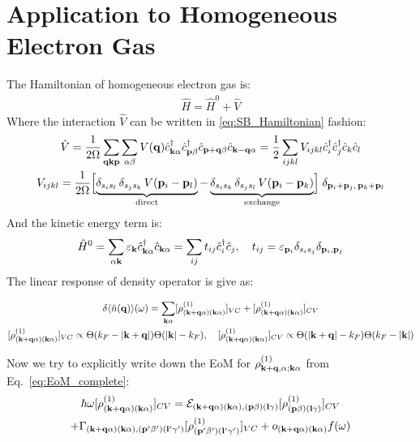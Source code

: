 \documentclass[11pt,letterpaper]{article}
\theoremstyle{definition}
\theoremstyle{plain}
\theoremstyle{remark}
\newcommand{\avg}[1]{\langle #1 \rangle}%
\newcommand{\eps}{\varepsilon}
\begin{document}
\section{Application to Homogeneous Electron Gas}
The Hamiltonian of homogeneous electron gas is:
\begin{gather}
    \hat{H} = \hat{H}^0 + \hat{V}
\end{gather}
Where the interaction $\hat{V}$ can be written in \eqref{eq:SB_Hamiltonian} fashion:
\begin{gather}
    \hat{V} = \frac{1}{2 \Omega}\sum_{\vb{q} \vb{k} \vb{p}} \sum_{\alpha \beta} V(\vb{q}) \hat{c}^\dagger_{\vb{k} \alpha} \hat{c}^\dagger_{\vb{p} \beta} \hat{c}_{\vb{p} + \vb{q} \beta} \hat{c}_{\vb{k} - \vb{q} \alpha} = \frac{1}{2} \sum_{ijkl} V_{ijkl} \hat{c}^\dagger_i \hat{c}^\dagger_j \hat{c}_k \hat{c}_l\\
    V_{ijkl} = \frac{1}{2\Omega}\Bigl[\underbrace{\delta_{s_i s_l}\,\delta_{s_j s_k}\,V(\vb{p}_i - \vb{p}_l)}_{\text{direct}} - \underbrace{\delta_{s_i s_k}\,\delta_{s_j s_l}\,V(\vb{p}_i - \vb{p}_k)}_{\text{exchange}}\Bigr]\;\delta_{\vb{p}_i + \vb{p}_j,\, \vb{p}_k + \vb{p}_l}
\end{gather}
And the kinetic energy term is:
\begin{gather}
    \hat{H}^0 = \sum_{\alpha  \vb{k}} \eps_{\vb{k}} \hat{c}^\dagger_{\vb{k} \alpha} \hat{c}_{\vb{k} \alpha} = \sum_{ij} t_{ij} \hat{c}^\dagger_i \hat{c}_j, \quad t_{ij} = \eps_{\vb{p}_i} \delta_{s_i s_j} \delta_{\vb{p}_i, \vb{p}_j}
\end{gather}
The linear response of density operator is give as:

\begin{gather}
    \delta \avg{\hat{n}(\vb{q})}(\omega) = \sum_{\vb{k} \alpha} [\rho^{(1)}_{(\vb{k} + \vb{q} \alpha) (\vb{k} \alpha)}]_{VC} + [\rho^{(1)}_{(\vb{k} + \vb{q} \alpha) (\vb{k} \alpha)}]_{CV} \\
    [\rho^{(1)}_{(\vb{k} + \vb{q} \alpha) (\vb{k} \alpha)}]_{VC} \propto \Theta(k_F - \abs{\vb{k} + \vb{q}}) \Theta(\abs{\vb{k}}-k_F), \quad [\rho^{(1)}_{(\vb{k} + \vb{q} \alpha) (\vb{k} \alpha)}]_{CV} \propto \Theta(\abs{\vb{k} + \vb{q}}-k_F) \Theta(k_F - \abs{\vb{k}})
\end{gather}

Now we try to explicitly write down the EoM for $\rho^{(1)}_{\vb{k} + \vb{q}, \alpha; \vb{k} \alpha}$ from Eq.~\eqref{eq:EoM_complete}:
\begin{gather}
    \hbar \omega[\rho^{(1)}_{(\vb{k} + \vb{q}\alpha) (\vb{k} \alpha)}]_{CV} = \mathcal{E}_{(\vb{k}+\vb{q} \alpha) (\vb{k} \alpha), (\vb{p} \beta)(\vb{l} \gamma)} [\rho^{(1)}_{(\vb{p} \beta) (\vb{l} \gamma)}]_{CV} \nonumber \\
    + \Gamma_{(\vb{k}+\vb{q} \alpha) (\vb{k} \alpha), (\vb{p}' \beta')(\vb{l}' \gamma')} [\rho^{(1)}_{(\vb{p}' \beta') (\vb{l}' \gamma')}]_{VC} + o_{(\vb{k}+\vb{q} \alpha) (\vb{k} \alpha)} f(\omega) \label{eq:EoM_HEG_CV} 
\end{gather}
\end{document}
